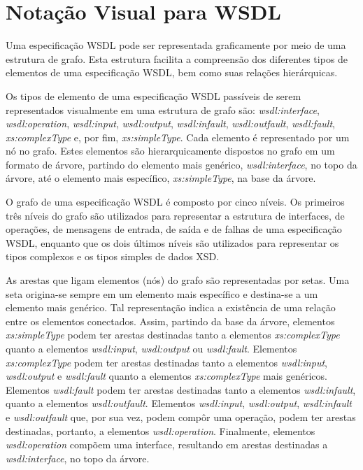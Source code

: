 \section{Notação Visual para WSDL}\label{3-notacao-visual-wsdl}

Uma especificação WSDL pode ser representada graficamente por meio de uma estrutura de grafo. Esta estrutura facilita a compreensão dos diferentes tipos de elementos de uma especificação WSDL, bem como suas relações hierárquicas.

Os tipos de elemento de uma especificação WSDL passíveis de serem representados visualmente em uma estrutura de grafo são: \textit{wsdl:interface}, \textit{wsdl:operation}, \textit{wsdl:input}, \textit{wsdl:output}, \textit{wsdl:infault}, \textit{wsdl:outfault}, \textit{wsdl:fault}, \textit{xs:complexType} e, por fim, \textit{xs:simpleType}. Cada elemento é representado por um nó no grafo. Estes elementos são hierarquicamente dispostos no grafo em um formato de árvore, partindo do elemento mais genérico, \textit{wsdl:interface}, no topo da árvore, até o elemento mais específico, \textit{xs:simpleType}, na base da árvore.

O grafo de uma especificação WSDL é composto por cinco níveis. Os primeiros três níveis do grafo são utilizados para representar a estrutura de interfaces, de operações, de mensagens de entrada, de saída e de falhas de uma especificação WSDL, enquanto que os dois últimos níveis são utilizados para representar os tipos complexos e os tipos simples de dados XSD.

As arestas que ligam elementos (nós) do grafo são representadas por setas. Uma seta origina-se sempre em um elemento mais específico e destina-se a um elemento mais genérico. Tal representação indica a existência de uma relação entre os elementos conectados. Assim, partindo da base da árvore, elementos \textit{xs:simpleType} podem ter arestas destinadas tanto a elementos \textit{xs:complexType} quanto a elementos \textit{wsdl:input}, \textit{wsdl:output} ou \textit{wsdl:fault}. Elementos \textit{xs:complexType} podem ter arestas destinadas tanto a elementos \textit{wsdl:input}, \textit{wsdl:output} e \textit{wsdl:fault} quanto a elementos \textit{xs:complexType} mais genéricos. Elementos \textit{wsdl:fault} podem ter arestas destinadas tanto a elementos \textit{wsdl:infault}, quanto a elementos \textit{wsdl:outfault}. Elementos \textit{wsdl:input}, \textit{wsdl:output}, \textit{wsdl:infault} e \textit{wsdl:outfault} que, por sua vez, podem compôr uma operação, podem ter arestas destinadas, portanto, a elementos \textit{wsdl:operation}. Finalmente, elementos \textit{wsdl:operation} compõem uma interface, resultando em arestas destinadas a \textit{wsdl:interface}, no topo da árvore.

